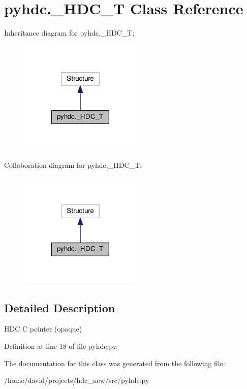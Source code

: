 \hypertarget{a00001}{}\section{pyhdc.\+\_\+\+H\+D\+C\+\_\+T Class Reference}
\label{a00001}


Inheritance diagram for pyhdc.\+\_\+\+H\+D\+C\+\_\+T\+:
\nopagebreak
\begin{figure}[H]
\begin{center}
\leavevmode
\includegraphics[width=165pt]{a00038}
\end{center}
\end{figure}


Collaboration diagram for pyhdc.\+\_\+\+H\+D\+C\+\_\+T\+:
\nopagebreak
\begin{figure}[H]
\begin{center}
\leavevmode
\includegraphics[width=165pt]{a00039}
\end{center}
\end{figure}


\subsection{Detailed Description}
\begin{DoxyVerb}HDC C pointer (opaque)
\end{DoxyVerb}
 

Definition at line 18 of file pyhdc.\+py.



The documentation for this class was generated from the following file\+:\begin{DoxyCompactItemize}
\item 
/home/david/projects/hdc\+\_\+new/src/pyhdc.\+py\end{DoxyCompactItemize}
